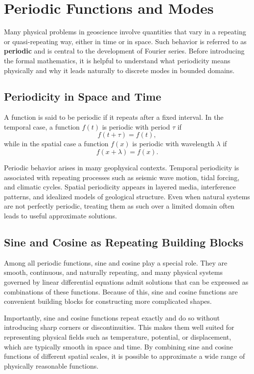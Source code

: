 \section{Periodic Functions and Modes}

Many physical problems in geoscience involve quantities that vary in a repeating or quasi-repeating way, either in time or in space. Such behavior is referred to as \textbf{periodic} and is central to the development of Fourier series. Before introducing the formal mathematics, it is helpful to understand what periodicity means physically and why it leads naturally to discrete modes in bounded domains.

\subsection{Periodicity in Space and Time}

A function is said to be periodic if it repeats after a fixed interval. In the temporal case, a function $f(t)$ is periodic with period $\tau$ if
\[
    f(t + \tau) = f(t),
\]
while in the spatial case a function $f(x)$ is periodic with wavelength $\lambda$ if
\[
    f(x + \lambda) = f(x).
\]

Periodic behavior arises in many geophysical contexts. Temporal periodicity is associated with repeating processes such as seismic wave motion, tidal forcing, and climatic cycles. Spatial periodicity appears in layered media, interference patterns, and idealized models of geological structure. Even when natural systems are not perfectly periodic, treating them as such over a limited domain often leads to useful approximate solutions.

\subsection{Sine and Cosine as Repeating Building Blocks}

Among all periodic functions, sine and cosine play a special role. They are smooth, continuous, and naturally repeating, and many physical systems governed by linear differential equations admit solutions that can be expressed as combinations of these functions. Because of this, sine and cosine functions are convenient building blocks for constructing more complicated shapes.

Importantly, sine and cosine functions repeat exactly and do so without introducing sharp corners or discontinuities. This makes them well suited for representing physical fields such as temperature, potential, or displacement, which are typically smooth in space and time. By combining sine and cosine functions of different spatial scales, it is possible to approximate a wide range of physically reasonable functions.

